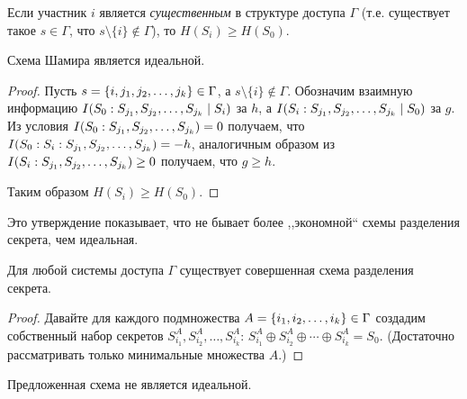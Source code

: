 \documentclass[12pt]{article}
\begin{document}
\begin{statement}
        Если участник $i$ является \emph{существенным} в структуре доступа $\Gamma$ (т.е. существует
        такое $s\in\Gamma$, что $s\setminus\{i\}\not\in\Gamma$), то $H(S_i)\ge H(S_0)$. 
\end{statement}
\begin{remark}
    Схема Шамира является идеальной.
\end{remark}
\begin{proof} Пусть $s=\{i,{j}_1,{j}_2,\dotsc,{j}_{k}\}\in\Gamma$, а $s\setminus \{i\}\not\in\Gamma$. 
    Обозначим взаимную информацию  $I(S_0:{S}_{{j}_1},{S}_{{j}_2},\dotsc,{S}_{{j}_{k}}\mid S_i)$ за $h$, 
    а $I(S_i:{S}_{{j}_1},{S}_{{j}_2},\dotsc,{S}_{{j}_{k}}\mid S_0)$ за $g$. Из условия 
    $I(S_0:{S}_{{j}_1},{S}_{{j}_2},\dotsc,{S}_{{j}_{k}}) = 0$ получаем, что $I(S_0:S_i:{S}_{{j}_1},{S}_{{j}_2},\dotsc,{S}_{{j}_{k}}) = -h$, аналогичным
    образом из $I(S_i:{S}_{{j}_1},{S}_{{j}_2},\dotsc,{S}_{{j}_{k}})\ge 0$ получаем, что $g \ge h$.

    \begin{center}
    \end{center}
    Таким образом $H(S_i) \ge H(S_0)$.
\end{proof}
\begin{remark}
    Это утверждение показывает, что не бывает более ,,экономной`` схемы разделения секрета, чем идеальная.
\end{remark}


\begin{statement}
    Для любой системы доступа $\Gamma$ существует совершенная схема разделения секрета.
\end{statement}
\begin{proof}
    Давайте для каждого подмножества $A = \{{i}_1,{i}_2,\dotsc,{i}_{k}\}\in\Gamma$ создадим собственный набор секретов
    $S^A_{i_1}, S^A_{i_2},\dotsc,S^A_{i_k}$: $S^A_{i_1}\oplus S^A_{i_2}\oplus\dotsb\oplus S^A_{i_k}
    = S_0$. 
   (Достаточно рассматривать только минимальные множества $A$.)
\end{proof}
\begin{remark}
    Предложенная схема не является идеальной.
\end{remark}
\end{document}
